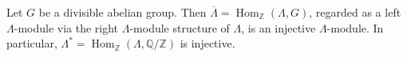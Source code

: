 Let $G$ be a divisible abelian group. Then $\overline{\Lambda} = \operatorname{Hom}_{\mathbb{Z}}(\Lambda, G)$, regarded as a left $\Lambda$-module via the right $\Lambda$-module structure of $\Lambda$, is an injective $\Lambda$-module. In particular, $\Lambda^* = \operatorname{Hom}_{\mathbb{Z}}(\Lambda, \mathbb{Q}/\mathbb{Z})$ is injective.